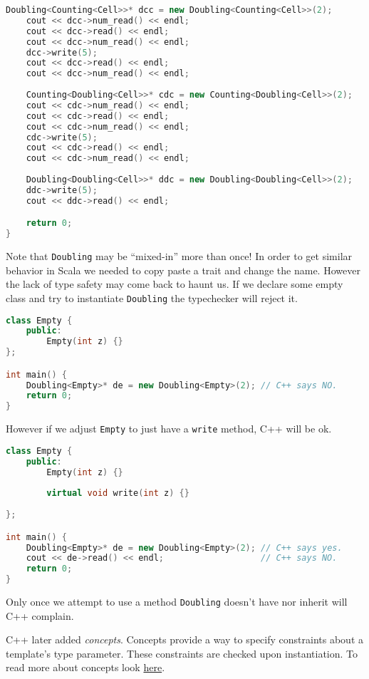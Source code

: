 \documentclass{article}
\begin{document}
\begin{example}
\begin{lstlisting}[escapechar=|, language=C++]
    Doubling<Counting<Cell>>* dcc = new Doubling<Counting<Cell>>(2);
    cout << dcc->num_read() << endl;
    cout << dcc->read() << endl;
    cout << dcc->num_read() << endl;
    dcc->write(5);
    cout << dcc->read() << endl;
    cout << dcc->num_read() << endl;
    
    Counting<Doubling<Cell>>* cdc = new Counting<Doubling<Cell>>(2);
    cout << cdc->num_read() << endl;
    cout << cdc->read() << endl;
    cout << cdc->num_read() << endl;
    cdc->write(5);
    cout << cdc->read() << endl;
    cout << cdc->num_read() << endl;
    
    Doubling<Doubling<Cell>>* ddc = new Doubling<Doubling<Cell>>(2);
    ddc->write(5);
    cout << ddc->read() << endl;

    return 0;
}
\end{lstlisting}
  Note that \texttt{Doubling} may be ``mixed-in'' more than once!
  In order to get similar behavior in Scala we needed to copy paste a trait and change the name.
  However the lack of type safety may come back to haunt us.
  If we declare some empty class and try to instantiate \texttt{Doubling} the typechecker will reject it.
\begin{lstlisting}[escapechar=|, language=C++]
class Empty {
    public:
        Empty(int z) {}
};

int main() {
    Doubling<Empty>* de = new Doubling<Empty>(2); // C++ says NO.
    return 0;
}
\end{lstlisting}
  However if we adjust \texttt{Empty} to just have a \texttt{write} method, C++ will be ok.
\begin{lstlisting}[escapechar=|, language=C++]
class Empty {
    public:
        Empty(int z) {}
        
        virtual void write(int z) {}
    
};

int main() {
    Doubling<Empty>* de = new Doubling<Empty>(2); // C++ says yes.
    cout << de->read() << endl;                   // C++ says NO.
    return 0;
}
\end{lstlisting}
  Only once we attempt to use a method \texttt{Doubling} doesn't have nor inherit will C++ complain.
\end{example}

C++ later added \textit{concepts}.
Concepts provide a way to specify constraints about a template's type parameter. These constraints are checked upon instantiation.
To read more about concepts look \href{https://en.cppreference.com/w/cpp/language/constraints}{here}.
\end{document}
